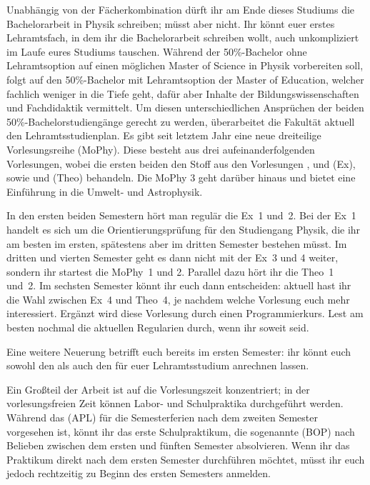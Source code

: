 Unabhängig von der Fächerkombination dürft ihr am Ende dieses Studiums die Bachelorarbeit in Physik schreiben; müsst aber nicht. Ihr könnt euer erstes Lehramtsfach, in dem ihr die Bachelorarbeit schreiben wollt, auch unkompliziert im Laufe eures Studiums tauschen.
Während der 50\%-Bachelor ohne Lehramtsoption auf einen möglichen Master of Science in Physik vorbereiten soll, folgt auf den 50\%-Bachelor mit Lehramtsoption der Master of Education, welcher fachlich weniger in die Tiefe geht, dafür aber Inhalte der Bildungswissenschaften und Fachdidaktik vermittelt. Um diesen unterschiedlichen Ansprüchen der beiden 50\%-Bachelorstudiengänge gerecht zu werden, überarbeitet die Fakultät aktuell den Lehramtsstudienplan. Es gibt seit letztem Jahr eine neue dreiteilige Vorlesungsreihe  (\gls{MoPhy}). Diese besteht aus drei aufeinanderfolgenden Vorlesungen, wobei die ersten beiden den Stoff aus den Vorlesungen ,  und  (\gls{Ex}), sowie  und  (\gls{Theo}) behandeln. Die \gls{MoPhy} 3 geht darüber hinaus und bietet eine Einführung in die Umwelt- und Astrophysik.

In den ersten beiden Semestern hört man regulär die Ex~1 und~2. Bei der Ex~1 handelt es sich um die Orientierungsprüfung für den Studiengang Physik, die ihr am besten im ersten, spätestens aber im dritten Semester bestehen müsst. Im dritten und vierten Semester geht es dann nicht mit der Ex~3 und 4 weiter, sondern ihr startest die MoPhy~1 und 2. Parallel dazu hört ihr die Theo~1 und~2. Im sechsten Semester könnt ihr euch dann entscheiden: aktuell hast ihr die Wahl zwischen Ex~4 und Theo~4, je nachdem welche Vorlesung euch mehr interessiert. Ergänzt wird diese Vorlesung durch einen Programmierkurs. Lest am besten nochmal die aktuellen Regularien durch, wenn ihr soweit seid.

Eine weitere Neuerung betrifft euch bereits im ersten Semester: ihr könnt euch sowohl den  als auch den  für euer Lehramtsstudium anrechnen lassen. 

Ein Großteil der Arbeit ist auf die Vorlesungszeit konzentriert; in der vorlesungsfreien Zeit können Labor- und Schulpraktika durchgeführt werden. Während das  (APL) für die Semesterferien nach dem zweiten Semester vorgesehen ist, könnt ihr das erste Schulpraktikum, die sogenannte  (\gls{BOP}) nach Belieben zwischen dem ersten und fünften Semester absolvieren. Wenn ihr das Praktikum direkt nach dem ersten Semester durchführen möchtet, müsst ihr euch jedoch rechtzeitig zu Beginn des ersten Semesters anmelden.


